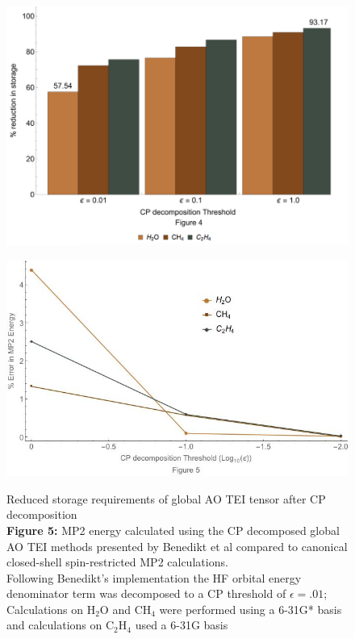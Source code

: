 		\begin{figure}
			\centering
				\begin{minipage}{.5\textwidth}
				  \centering
				  \includegraphics[width=1\linewidth]{./plots/Store}
				  \label{fig:Figure 4}
				\end{minipage}%
				\begin{minipage}{.5\textwidth}
				  \centering
				  \includegraphics[width=1 \linewidth]{./plots/Energy}
				  \label{fig:Figure 5}
				\end{minipage}
				\caption{Reduced storage requirements of global AO TEI tensor after CP decomposition\\
				\textbf{Figure 5:} MP2 energy calculated using the CP decomposed global AO TEI methods presented by Benedikt et al\cite{Benedikt2011} compared to canonical closed-shell spin-restricted MP2 calculations.\\
				Following Benedikt's implementation the HF orbital energy denominator term was decomposed to a CP threshold of $\epsilon = .01$; Calculations on $\text{H}_2\text{O}$ and $\text{CH}_4$ were performed using a 6-31G* basis and calculations on $\text{C}_2\text{H}_4$ used a 6-31G basis}
		\end{figure}

